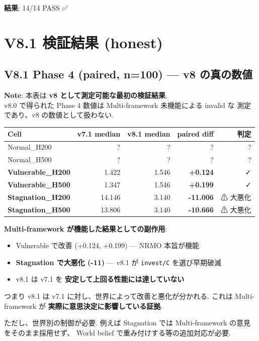 \documentclass[a4paper,11pt]{report}
\begin{document}
\textbf{結果}: 14/14 PASS ✅

\chapter{V8.1 検証結果 (honest)}

\section{V8.1 Phase 4 (paired, n=100) — v8 の真の数値}

\begin{tcolorbox}[colback=red!5, colframe=red]
\textbf{Note}: 本表は \textbf{v8 として測定可能な最初の検証結果}.\\
v8.0 で得られた Phase 4 数値は Multi-framework 未機能による invalid な
測定であり、v8 の数値として扱わない.
\end{tcolorbox}

\begin{longtable}{l r r r r}
\toprule
Cell & v7.1 median & v8.1 median & paired diff & 判定 \\
\midrule
Normal\_H200 & ? & ? & ? & ? \\
Normal\_H500 & ? & ? & ? & ? \\
\textbf{Vulnerable\_H200} & 1.422 & 1.546 & \textcolor{success}{\textbf{+0.124}} & ✓ \\
\textbf{Vulnerable\_H500} & 1.347 & 1.546 & \textcolor{success}{\textbf{+0.199}} & ✓ \\
\textbf{Stagnation\_H200} & 14.146 & 3.140 & \textcolor{warning}{\textbf{-11.006}} & ⚠ 大悪化 \\
\textbf{Stagnation\_H500} & 13.806 & 3.140 & \textcolor{warning}{\textbf{-10.666}} & ⚠ 大悪化 \\
\bottomrule
\end{longtable}

\begin{honest}
\textbf{Multi-framework が機能した結果としての副作用}:

\begin{itemize}[leftmargin=*]
  \item Vulnerable で改善 (+0.124, +0.199) — NRMO 本旨が機能
  \item \textbf{Stagnation で大悪化 (-11)} — v8.1 が \texttt{invest/C} を選び早期破滅
  \item v8.1 は v7.1 を \textbf{安定して上回る性能には達していない}
\end{itemize}

つまり v8.1 は v7.1 に対し、世界によって改善と悪化が分かれる.
これは Multi-framework が \textbf{実際に意思決定に影響している証拠}.

ただし、世界別の制御が必要. 例えば Stagnation では Multi-framework の意見をそのまま採用せず、
World belief で重み付けする等の追加対応が必要.
\end{honest}
\end{document}
